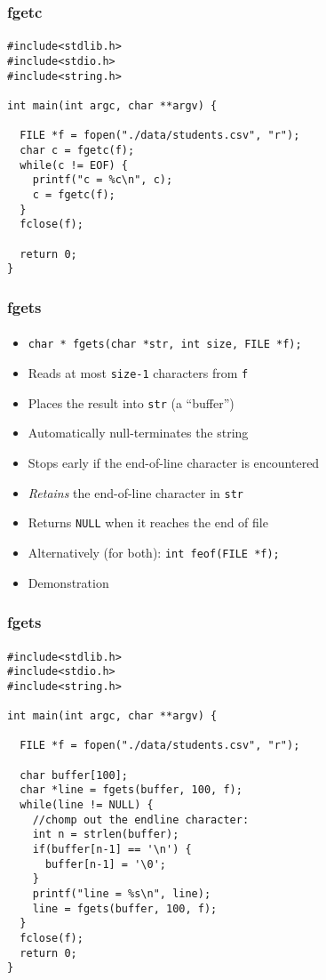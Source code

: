 \documentclass[]{beamer}
\begin{document}
\begin{frame}[fragile]
  \frametitle{fgetc}
  \framesubtitle{}

\begin{verbatim}
#include<stdlib.h>
#include<stdio.h>
#include<string.h>

int main(int argc, char **argv) {

  FILE *f = fopen("./data/students.csv", "r");
  char c = fgetc(f);
  while(c != EOF) {
    printf("c = %c\n", c);
    c = fgetc(f);
  }
  fclose(f);

  return 0;
}
\end{verbatim}
  
\end{frame}


\begin{frame}[fragile]
  \frametitle{fgets}
  \framesubtitle{}

\begin{itemize}[<+->]
  \item \texttt{char * fgets(char *str, int size, FILE *f);}
  \item Reads at most \texttt{size-1} characters from \texttt{f}
  \item Places the result into \texttt{str} (a ``buffer'')
  \item Automatically null-terminates the string
  \item Stops early if the end-of-line character \texttt{\n} is encountered
  \item \emph{Retains} the end-of-line character in \texttt{str}
  \item Returns \texttt{NULL} when it reaches the end of file
  \item Alternatively (for both): \texttt{int feof(FILE *f);}
  \item Demonstration
\end{itemize}

\end{frame}

\begin{frame}[fragile]
  \frametitle{fgets}
  \framesubtitle{}

\begin{verbatim}
#include<stdlib.h>
#include<stdio.h>
#include<string.h>

int main(int argc, char **argv) {

  FILE *f = fopen("./data/students.csv", "r");

  char buffer[100];
  char *line = fgets(buffer, 100, f);
  while(line != NULL) {
    //chomp out the endline character:
    int n = strlen(buffer);
    if(buffer[n-1] == '\n') {
      buffer[n-1] = '\0';
    }
    printf("line = %s\n", line);
    line = fgets(buffer, 100, f);
  }
  fclose(f);
  return 0;
}
\end{verbatim}
  
\end{frame}
\end{document}
